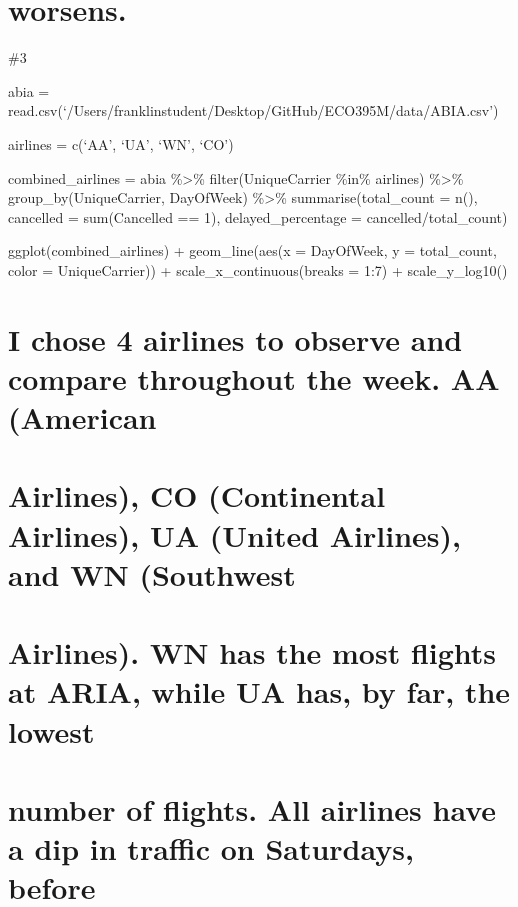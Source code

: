 \documentclass[
]{article}
\begin{document}
\hypertarget{worsens.}{%
\section{worsens.}\label{worsens.}}

\#3

abia =
read.csv(`/Users/franklinstudent/Desktop/GitHub/ECO395M/data/ABIA.csv')

airlines = c(`AA', `UA', `WN', `CO')

combined\_airlines = abia \%\textgreater\% filter(UniqueCarrier \%in\%
airlines) \%\textgreater\% group\_by(UniqueCarrier, DayOfWeek)
\%\textgreater\% summarise(total\_count = n(), cancelled = sum(Cancelled
== 1), delayed\_percentage = cancelled/total\_count)

ggplot(combined\_airlines) + geom\_line(aes(x = DayOfWeek, y =
total\_count, color = UniqueCarrier)) + scale\_x\_continuous(breaks =
1:7) + scale\_y\_log10()

\hypertarget{i-chose-4-airlines-to-observe-and-compare-throughout-the-week.-aa-american}{%
\section{I chose 4 airlines to observe and compare throughout the week.
AA
(American}\label{i-chose-4-airlines-to-observe-and-compare-throughout-the-week.-aa-american}}

\hypertarget{airlines-co-continental-airlines-ua-united-airlines-and-wn-southwest}{%
\section{Airlines), CO (Continental Airlines), UA (United Airlines), and
WN
(Southwest}\label{airlines-co-continental-airlines-ua-united-airlines-and-wn-southwest}}

\hypertarget{airlines.-wn-has-the-most-flights-at-aria-while-ua-has-by-far-the-lowest}{%
\section{Airlines). WN has the most flights at ARIA, while UA has, by
far, the
lowest}\label{airlines.-wn-has-the-most-flights-at-aria-while-ua-has-by-far-the-lowest}}

\hypertarget{number-of-flights.-all-airlines-have-a-dip-in-traffic-on-saturdays-before}{%
\section{number of flights. All airlines have a dip in traffic on
Saturdays,
before}\label{number-of-flights.-all-airlines-have-a-dip-in-traffic-on-saturdays-before}}
\end{document}
